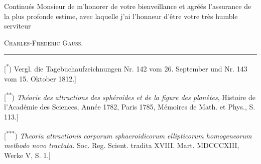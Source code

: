 \indent Continués Monsieur de m’honorer de votre bienveillance et agréés l’assurance de la plus profonde estime, avec laquelle j’ai l’honneur d’être votre très humble serviteur
\begin{flushright}\textsc{Charles-Frederic Gauss}.\end{flushright}
\par\medskip\noindent\rule{.24\linewidth}{.4pt}\par\smallskip
{\small
\noindent\hspace*{\parindent}[\textsuperscript{*}) Vergl. die Tagebuchaufzeichnungen Nr. 142 vom 26. September und Nr. 143 vom 15. Oktober 1812.]
\par\noindent\hspace*{\parindent}[\textsuperscript{**}) \textit{Théorie des attractions des sphéroïdes et de la figure des planètes}, Histoire de l’Académie des Sciences, Année 1782, Paris 1785, Mémoires de Math. et Phys., S. 113.]
\par\noindent\hspace*{\parindent}[\textsuperscript{***}) \textit{Theoria attractionis corporum sphaeroidicorum ellipticorum homogeneorum methodo novo tractata.} Soc. Reg. Scient. tradita XVIII. Mart. MDCCCXIII, Werke V, S. 1.]
\par}
